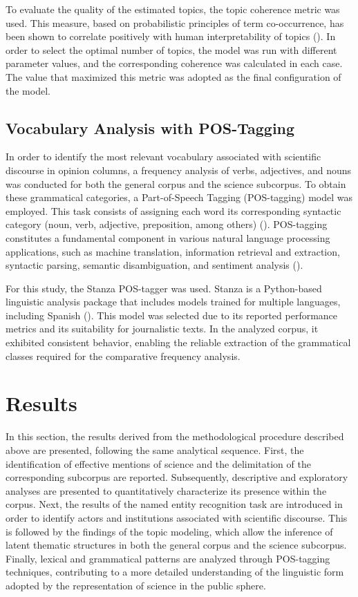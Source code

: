 \documentclass[11pt,a4paper]{article}
\begin{document}
	To evaluate the quality of the estimated topics, the topic coherence metric was used. This measure, based on probabilistic principles of term co-occurrence, has been shown to correlate positively with human interpretability of topics (\cite{Rder2015}). In order to select the optimal number of topics, the model was run with different parameter values, and the corresponding coherence was calculated in each case. The value that maximized this metric was adopted as the final configuration of the model.


	\subsection{Vocabulary Analysis with POS-Tagging}
	
	In order to identify the most relevant vocabulary associated with scientific discourse in opinion columns, a frequency analysis of verbs, adjectives, and nouns was conducted for both the general corpus and the science subcorpus. To obtain these grammatical categories, a Part-of-Speech Tagging (POS-tagging) model was employed. This task consists of assigning each word its corresponding syntactic category (noun, verb, adjective, preposition, among others) (\cite{he2020surveyrecentadvancessequence}). POS-tagging constitutes a fundamental component in various natural language processing applications, such as machine translation, information retrieval and extraction, syntactic parsing, semantic disambiguation, and sentiment analysis (\cite{Chiche2022}).
	
	For this study, the Stanza POS-tagger was used. Stanza is a Python-based linguistic analysis package that includes models trained for multiple languages, including Spanish (\cite{qi2020stanza}). This model was selected due to its reported performance metrics and its suitability for journalistic texts. In the analyzed corpus, it exhibited consistent behavior, enabling the reliable extraction of the grammatical classes required for the comparative frequency analysis.
	
	
	
	\section{Results}


In this section, the results derived from the methodological procedure described above are presented, following the same analytical sequence. First, the identification of effective mentions of science and the delimitation of the corresponding subcorpus are reported. Subsequently, descriptive and exploratory analyses are presented to quantitatively characterize its presence within the corpus. Next, the results of the named entity recognition task are introduced in order to identify actors and institutions associated with scientific discourse. This is followed by the findings of the topic modeling, which allow the inference of latent thematic structures in both the general corpus and the science subcorpus. Finally, lexical and grammatical patterns are analyzed through POS-tagging techniques, contributing to a more detailed understanding of the linguistic form adopted by the representation of science in the public sphere.
\end{document}
